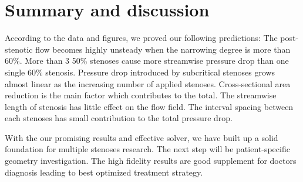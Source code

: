 \section{Summary and discussion}
According to the data and figures, we proved our following predictions:
The post-stenotic flow becomes highly unsteady when the narrowing degree is more than 60\%.
More than 3 50\% stenoses cause more streamwise pressure drop than one single 60\% stenosis.
Pressure drop introduced by subcritical stenoses grows almost linear as the increasing number of applied stenoses. 
Cross-sectional area reduction is the main factor which contributes to the total. The streamwise length of stenosis has little effect on the flow field.
The interval spacing between each stenoses has small contribution to the total pressure drop.


With the our promising results and effective solver, we have built up a solid foundation for multiple stenoses research. The next step will be patient-specific geometry investigation. The high fidelity results are good supplement for doctors diagnosis leading to best optimized treatment strategy.   
